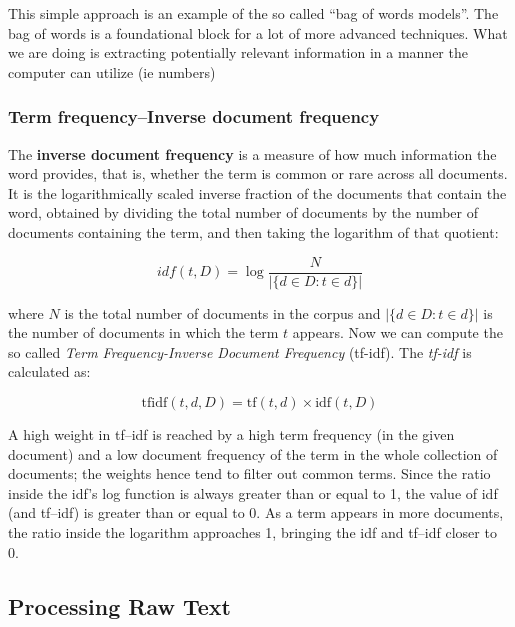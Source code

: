 \documentclass[11pt]{article}
\begin{document}
This simple approach is an example of the so called ``bag of words
models''. The bag of words is a foundational block for a lot of more
advanced techniques. What we are doing is extracting potentially
relevant information in a manner the computer can utilize (ie numbers)

    \hypertarget{term-frequencyinverse-document-frequency}{%
\subsubsection{Term frequency--Inverse document
frequency}\label{term-frequencyinverse-document-frequency}}

    The \textbf{inverse document frequency} is a measure of how much
information the word provides, that is, whether the term is common or
rare across all documents. It is the logarithmically scaled inverse
fraction of the documents that contain the word, obtained by dividing
the total number of documents by the number of documents containing the
term, and then taking the logarithm of that quotient:

\begin{equation}
idf(t, D) = \log \frac{N}{\vert\{d \in D : t \in d  \}\vert}
\end{equation}

    where \(N\) is the total number of documents in the corpus and
\(\vert\{d \in D : t \in d \}\vert\) is the number of documents in which
the term \(t\) appears. Now we can compute the so called \emph{Term
Frequency-Inverse Document Frequency} (tf-idf). The \emph{tf-idf} is
calculated as:

\begin{equation}
\text{tfidf}(t, d, D) = \text{tf}(t, d) \times \text{idf}(t,D)
\end{equation}

A high weight in tf--idf is reached by a high term frequency (in the
given document) and a low document frequency of the term in the whole
collection of documents; the weights hence tend to filter out common
terms. Since the ratio inside the idf's log function is always greater
than or equal to 1, the value of idf (and tf--idf) is greater than or
equal to 0. As a term appears in more documents, the ratio inside the
logarithm approaches 1, bringing the idf and tf--idf closer to 0.

    \hypertarget{processing-raw-text}{%
\subsection{Processing Raw Text}\label{processing-raw-text}}
\end{document}

